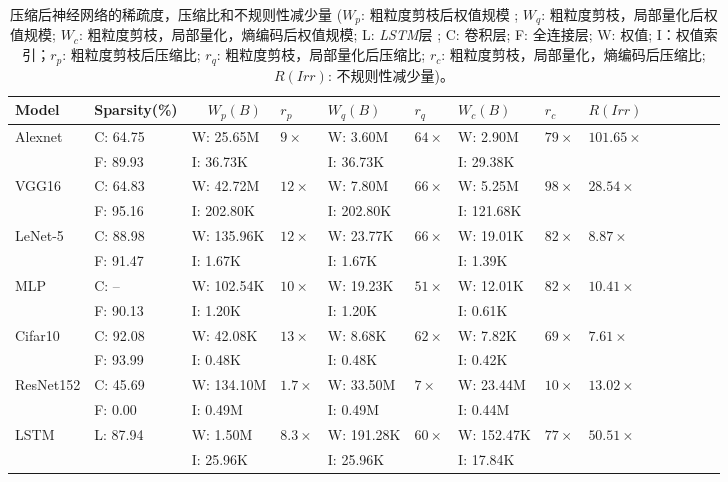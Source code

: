 \begin{table}[h]
\centering
\caption{压缩后神经网络的稀疏度，压缩比和不规则性减少量 ($W_p$: 粗粒度剪枝后权值规模 ; $W_q$: 粗粒度剪枝，局部量化后权值规模; $W_c$: 粗粒度剪枝，局部量化，熵编码后权值规模; L: \emph{LSTM}层 ; C: 卷积层; F: 全连接层; W: 权值; I：权值索引；$r_p$: 粗粒度剪枝后压缩比; $r_q$: 粗粒度剪枝，局部量化后压缩比; $r_c$: 粗粒度剪枝，局部量化，熵编码后压缩比; $R(Irr)$: 不规则性减少量)。}
\label{tab:compression}
\begin{tabular}{@{}l@{~}l@{\!\!}l@{~}l@{\,}l@{~}l@{\,}l@{}l@{~}l@{~}l@{~}l@{~}lll}
\toprule
Model		&\!\!\!Sparsity(\%) & ~~$W_p(B)$ 	& $r_p$ 	& $W_q(B)$ 		& $r_q$ 		& $W_c(B)$ 		& $r_c$			& $R(Irr)$ 				\\
\midrule
Alexnet 	& C: 64.75\ 		&W: 25.65M  &$9\times$   &W: 3.60M 		& $64\times$ 	& W: 2.90M		& $79\times$	& $101.65\times$	 				\\
  			& F: 89.93\ 		&I: 36.73K  &  			 &I: 36.73K 	&  	 			& I: 29.38K 	& 				&		\\
VGG16 		& C: 64.83\ 		&W: 42.72M  &$12\times$  &W: 7.80M		& $66\times$ 	& W: 5.25M 		& $98\times$	& $28.54\times$  	 				\\
  			& F: 95.16\  		&I: 202.80K &			 &I: 202.80K 	&  	  			& I: 121.68K	& 	  	 		&			\\
LeNet-5 		& C: 88.98\ 		&W: 135.96K &$12\times$  &W: 23.77K 	& $66\times$  	& W: 19.01K		& $82\times$	& $8.87\times$ 	 				\\
  			& F: 91.47\  		&I: 1.67K   &			 &I: 1.67K		&  	   			& I: 1.39K 						& \\
MLP 		& C: --				&W: 102.54K &$10\times$  &W: 19.23K 	& $51\times$  	& W: 12.01K 	& $82\times$ 	& $10.41\times$				\\
  			& F: 90.13\  		&I: 1.20K   &			 &I: 1.20K		&  				& I: 0.61K	 	&  				& 		\\
Cifar10 	& C: 92.08\			&W: 42.08K  &$13\times$	 &W: 8.68K 		& $62\times$   	& W: 7.82K		& $69\times$ 	& $7.61\times$			\\
  			& F: 93.99\  		&I: 0.48K   &			 &I: 0.48K		&  		       	& I: 0.42K  	&				& \\
ResNet152 	& C: 45.69\			&W: 134.10M &$1.7\times$ &W: 33.50M		& $7\times$  	& W: 23.44M		& $10\times$ 	& $13.02\times$					\\
  		    & F: 0.00\ 		    &I: 0.49M   &			 &I: 0.49M		&				&  I: 0.44M		&	 			& \\

LSTM 		& L: 87.94  		&W: 1.50M 	&$8.3\times$  &W: 191.28K 	& $60\times$	& W: 152.47K 	& $77\times$	& $50.51\times$							\\
  			&   				&I: 25.96K   & 			 &I: 25.96K 		&			& I: 17.84K	  	& 				&		\\
\bottomrule
\end{tabular}
\end{table}


